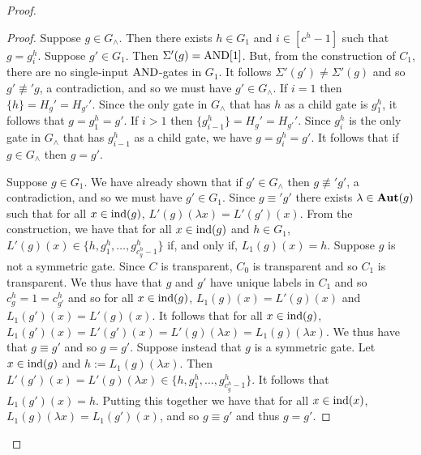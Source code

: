\documentclass[../paper.tex]{subfiles}
\begin{document}
\begin{proof}
\begin{proof}
    
    Suppose $g \in G_{\land}$. Then there exists $h \in G_1$ and $i \in [c^h -
    1]$ such that $g = g^h_i$. Suppose $g' \in G_1$. Then $\Sigma'(g) =
    \text{\upshape AND}[1]$. But, from the construction of $C_1$, there are no single-input
    $\text{\upshape AND}$-gates in $G_1$. It follows $\Sigma'(g') \neq \Sigma'(g)$ and so $g'
    \not\equiv' g$, a contradiction, and so we must have $g' \in G_{\land}$. If
    $i = 1$ then $\{ h \} = H_g' = H_{g'}'$. Since the only gate in $G_\land$
    that has $h$ as a child gate is $g^h_1$, it follows that $g = g^h_1 = g'$.
    If $i > 1$ then $\{g^{h}_{i-1}\} = H_g' = H_{g'}'$. Since $g^h_i$ is the
    only gate in $G_\land$ that has $g^h_{i-1}$ as a child gate, we have $g =
    g^h_i = g'$. It follows that if $g \in G_\land$ then $g = g'$.

    Suppose $g \in G_1$. We have already shown that if $g' \in G_\land$ then $g
    \not\equiv' g'$, a contradiction, and so we must have $g' \in G_1$. Since $g
    \equiv' g'$ there exists $\lambda \in \text{\textbf{Aut}}(g)$ such that for all $x \in
    \text{\upshape ind}(g)$, $L'(g)(\lambda x) = L'(g')(x)$. From the construction, we have
    that for all $x \in \text{\upshape ind}(g)$ and $h \in G_1$, $L'(g)(x) \in \{h, g^h_1 ,
    \ldots, g^h_{c^h_g -1}\}$ if, and only if, $L_1(g)(x) = h$. Suppose $g$ is
    not a symmetric gate. Since $C$ is transparent, $C_0$ is transparent and so
    $C_1$ is transparent. We thus have that $g$ and $g'$ have unique labels in
    $C_1$ and so $c^h_g = 1 = c^h_{g'}$ and so for all $x \in \text{\upshape ind}(g)$,
    $L_1(g)(x) = L'(g)(x)$ and $L_1(g')(x) = L'(g)(x)$. It follows that for all
    $x \in \text{\upshape ind}(g)$, $L_1(g')(x) = L'(g')(x) = L'(g)(\lambda x) = L_1(g)(\lambda
    x)$. We thus have that $g \equiv g'$ and so $g = g'$. Suppose instead that
    $g$ is a symmetric gate. Let $x \in \text{\upshape ind}(g)$ and $h := L_1(g)(\lambda x)$.
    Then $L' (g')(x) = L'(g)(\lambda x) \in \{h, g^h_1, \ldots , g^h_{c^h_g -
      1}\}$. It follows that $L_1(g')(x) = h$. Putting this together we have
    that for all $x \in \text{\upshape ind}(x)$, $L_1(g) (\lambda x) = L_1(g')(x)$, and so $g
    \equiv g'$ and thus $g = g'$.
    


\end{proof}
\end{proof}
\end{document}
